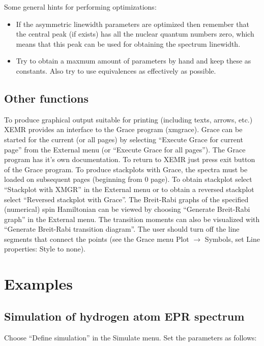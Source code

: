 \documentclass[byrevtex,amssymb,aps,pra,floatfix,letterpaper]{revtex4}
\begin{document}
\noindent
Some general hints for performing optimizations:\\

\begin{itemize}
\item If the asymmetric linewidth parameters are optimized then remember that the central peak (if exists) has all the nuclear quantum numbers zero, which means that this peak can be used for obtaining the spectrum linewidth.
\item Try to obtain a maxmum amount of parameters by hand and keep these as constants. Also try to use equivalences as effectively as possible.
\end{itemize}

\subsection{Other functions}

To produce graphical output suitable for printing (including texts, arrows, etc.) XEMR provides an interface to the Grace program (xmgrace). Grace can be started for the current (or all pages) by selecting ``Execute Grace for current page'' from the External menu (or ``Execute Grace for all pages''). The Grace program has it's own documentation. To return to XEMR just press exit button of the Grace program. To produce stackplots with Grace, the spectra must be loaded on subsequent pages (beginning from 0 page). To obtain stackplot select ``Stackplot with XMGR'' in the External menu or to obtain a reversed stackplot select ``Reversed stackplot with Grace''. The Breit-Rabi graphs of the specified (numerical) spin Hamiltonian can be viewed by choosing ``Generate Breit-Rabi graph'' in the External menu. The transition moments can also be visualized with ``Generate Breit-Rabi transition diagram''. The user should turn off the line segments that connect the points (see the Grace menu Plot $\rightarrow$ Symbols, set Line properties: Style to none).

\section{Examples}

\subsection{Simulation of hydrogen atom EPR spectrum}

Choose ``Define simulation'' in the Simulate menu. Set the parameters as follows:
\end{document}
